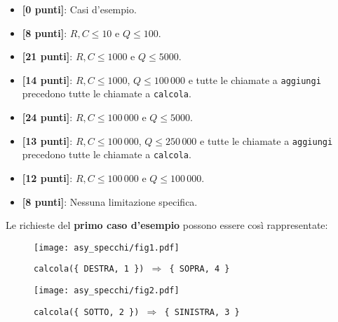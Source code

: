 \begin{itemize}[nolistsep,itemsep=2mm]
  \item \textbf{ [\phantom{1}0 punti]}: Casi d'esempio.
  \item \textbf{ [\phantom{1}8 punti]}: $R, C \leq 10$ e $Q \le 100$.
  \item \textbf{ [21 punti]}: $R, C \leq 1000$ e $Q \le 5000$.
  \item \textbf{ [14 punti]}: $R, C \leq 1000$, $Q \leq 100\,000$ e tutte le chiamate a \texttt{aggiungi} precedono tutte le chiamate a \texttt{calcola}.
  \item \textbf{ [24 punti]}: $R, C \leq 100\,000$ e $Q \le 5000$.
  \item \textbf{ [13 punti]}: $R, C \leq 100\,000$, $Q \leq 250\,000$ e tutte le chiamate a \texttt{aggiungi} precedono tutte le chiamate a \texttt{calcola}.
  \item \textbf{ [12 punti]}: $R, C \leq 100\,000$ e $Q \le 100\,000$.
  \item \textbf{ [\phantom{1}8 punti]}: Nessuna limitazione specifica.
\end{itemize}



\Examples

\begin{example}
%
%
\end{example}



\Explanation

Le richieste del \textbf{primo caso d'esempio} possono essere così rappresentate:

\begin{minipage}{.49\textwidth}
	\begin{figure}[H]
		\centering\texttt{[image: asy\_specchi/fig1.pdf]}
		\caption*{\texttt{calcola(\{ DESTRA, 1 \}) $\Rightarrow$ \{ SOPRA, 4 \}}}
	\end{figure}
\end{minipage}
\begin{minipage}{.49\textwidth}
	\begin{figure}[H]
		\centering\texttt{[image: asy\_specchi/fig2.pdf]}
		\caption*{\texttt{calcola(\{ SOTTO, 2 \}) $\Rightarrow$ \{ SINISTRA, 3 \}}}
	\end{figure}
\end{minipage}


